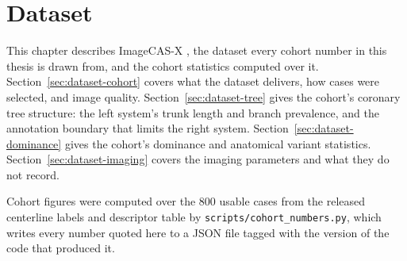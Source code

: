
\chapter{Dataset}
\label{ch:dataset}

This chapter describes ImageCAS-X \cite{bransby2026imagecasx}, the dataset every cohort number in
this thesis is drawn from, and the cohort statistics computed over it.
Section~\ref{sec:dataset-cohort} covers what the dataset delivers, how cases were selected, and
image quality.
Section~\ref{sec:dataset-tree} gives the cohort's coronary tree structure: the left system's trunk
length and branch prevalence, and the annotation boundary that limits the right system.
Section~\ref{sec:dataset-dominance} gives the cohort's dominance and anatomical variant statistics.
Section~\ref{sec:dataset-imaging} covers the imaging parameters and what they do not record.

Cohort figures were computed over the 800 usable cases from the released centerline labels and
descriptor table by \texttt{scripts/cohort\_numbers.py}, which writes every number quoted here to
a JSON file tagged with the version of the code that produced it.
